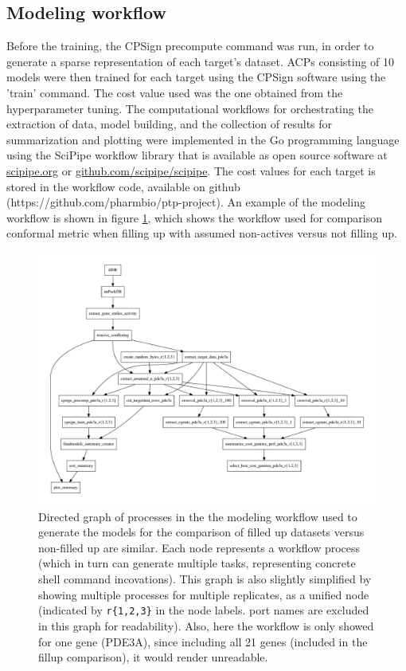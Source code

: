 \documentclass[10pt,article]{memoir}
\begin{document}
\subsection{Modeling workflow}
Before the training, the CPSign precompute command was run, in order to
generate a sparse representation of each target's dataset.
ACPs consisting of 10 models were then trained for each target using the CPSign software using the 'train' command.
The cost value used was the one obtained from the hyperparameter tuning. 
The computational workflows for orchestrating the extraction of data, model building, 
and the collection of results for summarization and plotting were
implemented in the Go programming language using the SciPipe workflow library 
that is available as open source software at
\href{http://scipipe.org}{scipipe.org} or \href{https://github.com/scipipe/scipipe}{github.com/scipipe/scipipe}.
The cost values for each target is stored in the workflow code, available on
github (https://github.com/pharmbio/ptp-project).  An example of the modeling
workflow is shown in figure \ref{fig:workflow_graph_clean}, which shows the workflow
used for comparison conformal metric when filling up with assumed non-actives versus
not filling up.

\begin{figure}[h!]
\includegraphics[width=\textwidth]{figures/workflow_graph_clean.pdf}
    \caption{Directed graph of processes in the the modeling workflow used to
    generate the models for the comparison of filled up datasets versus
    non-filled up are similar. Each node represents a workflow process (which
    in turn can generate multiple tasks, representing concrete shell command
    incovations). This graph is also slightly simplified by showing multiple
    processes for multiple replicates, as a unified node (indicated by
    \texttt{r\{1,2,3\}} in the node labels.  port names are excluded in this
    graph for readability). Also, here the workflow is only showed for one gene
    (PDE3A), since including all 21 genes (included in the fillup comparison),
    it would render unreadable.}
    \label{fig:workflow_graph_clean}
\end{figure}
\end{document}

